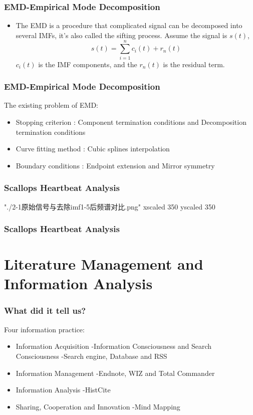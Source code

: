 \documentclass[notheorems,mathserif,table,compress]{beamer}  %
\begin{document}
%
\begin{frame}
\frametitle{EMD-Empirical Mode Decomposition}
\begin{itemize}
\item The EMD is a procedure that complicated signal can be decomposed into several IMFs, it's also called the sifting process.
Assume the signal is $s(t)$,
\begin{displaymath}
s(t)=\sum^n_{i=1}c_i(t)+r_n(t)
\end{displaymath}
$c_i(t)$ is the IMF components, and the $r_n(t)$ is the residual term.
\end{itemize}
\end{frame}

%
\begin{frame}
\frametitle{EMD-Empirical Mode Decomposition}
The existing problem of EMD:
\begin{itemize}
\item Stopping criterion : Component termination conditions and Decomposition termination conditions 
\item Curve fitting method : Cubic splines interpolation
\item Boundary conditions : Endpoint extension and Mirror symmetry
\end{itemize}
\end{frame}

%
\begin{frame}
\frametitle{Scallops Heartbeat Analysis}
\XeTeXpicfile "./2-1原始信号与去除imf1-5后频谱对比.png" xscaled 350 yscaled 350
\end{frame}
%
\begin{frame}
\frametitle{Scallops Heartbeat Analysis}

\end{frame}

\section{Literature Management and Information Analysis}

%
\begin{frame}
\frametitle{What did it tell us?}
Four information practice:
\begin{itemize}
\item Information Acquisition \newline
-Information Consciousness and Search Consciousness \newline
-Search engine, Database and RSS
\item Information Management \newline
-Endnote, WIZ and Total Commander 
\item Information Analysis \newline
-HistCite
\item Sharing, Cooperation and Innovation \newline
-Mind Mapping
\end{itemize}
\end{frame}
\end{document}
